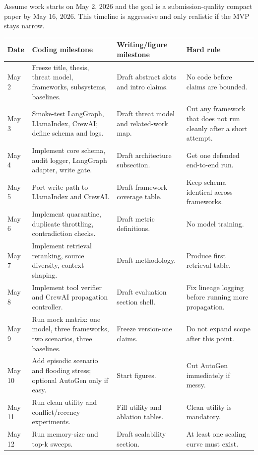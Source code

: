 \documentclass[11pt,oneside]{report}
\begin{document}
Assume work starts on May 2, 2026 and the goal is a submission-quality compact paper by May 16,
2026. This timeline is aggressive and only realistic if the MVP stays narrow.

\begin{longtable}{|L{0.11\textwidth}|L{0.32\textwidth}|L{0.27\textwidth}|L{0.20\textwidth}|}
\hline
\textbf{Date} & \textbf{Coding milestone} & \textbf{Writing/figure milestone} & \textbf{Hard rule} \\
\hline
May 2 & Freeze title, thesis, threat model, frameworks, subsystems, baselines. & Draft abstract
slots and intro claims. & No code before claims are bounded. \\
\hline
May 3 & Smoke-test LangGraph, LlamaIndex, CrewAI; define schema and logs. & Draft threat model and
related-work map. & Cut any framework that does not run cleanly after a short attempt. \\
\hline
May 4 & Implement core schema, audit logger, LangGraph adapter, write gate. & Draft architecture
subsection. & Get one defended end-to-end run. \\
\hline
May 5 & Port write path to LlamaIndex and CrewAI. & Draft framework coverage table. & Keep schema
identical across frameworks. \\
\hline
May 6 & Implement quarantine, duplicate throttling, contradiction checks. & Draft metric
definitions. & No model training. \\
\hline
May 7 & Implement retrieval reranking, source diversity, context shaping. & Draft methodology. &
Produce first retrieval table. \\
\hline
May 8 & Implement tool verifier and CrewAI propagation controller. & Draft evaluation section shell.
& Fix lineage logging before running more propagation. \\
\hline
May 9 & Run mock matrix: one model, three frameworks, two scenarios, three baselines. & Freeze
version-one claims. & Do not expand scope after this point. \\
\hline
May 10 & Add episodic scenario and flooding stress; optional AutoGen only if easy. & Start figures. &
Cut AutoGen immediately if messy. \\
\hline
May 11 & Run clean utility and conflict/recency experiments. & Fill utility and ablation tables. &
Clean utility is mandatory. \\
\hline
May 12 & Run memory-size and top-k sweeps. & Draft scalability section. & At least one scaling curve
must exist. \\
\hline

\end{longtable}
\end{document}
